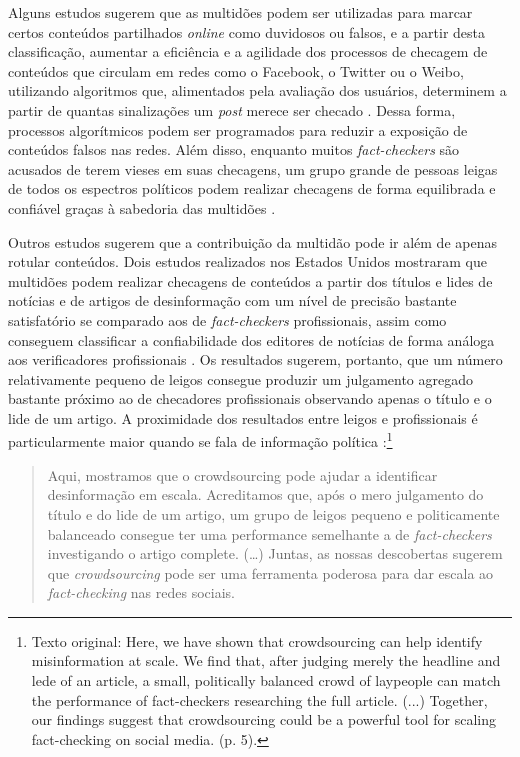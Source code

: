 \documentclass[portuguese]{textolivre}
\begin{document}
Alguns estudos sugerem que as multidões podem ser utilizadas para marcar certos conteúdos partilhados \emph{online} como duvidosos ou falsos, e a partir desta classificação, aumentar a eficiência e a agilidade dos processos de checagem de conteúdos que circulam em redes como o Facebook, o Twitter ou o Weibo, utilizando algoritmos que, alimentados pela avaliação dos usuários, determinem a partir de quantas sinalizações um \emph{post} merece ser checado \cite{kim_leveraging_2018}. Dessa forma, processos algorítmicos podem ser programados para reduzir a exposição de conteúdos falsos nas redes. Além disso, enquanto muitos \emph{fact-checkers} são acusados de terem vieses em suas checagens, um grupo grande de pessoas leigas de todos os espectros políticos podem realizar checagens de forma equilibrada e confiável graças à sabedoria das multidões \cite{allen_scaling_2021}.

Outros estudos sugerem que a contribuição da multidão pode ir além de apenas rotular conteúdos. Dois estudos realizados nos Estados Unidos mostraram que multidões podem realizar checagens de conteúdos a partir dos títulos e lides de notícias e de artigos de desinformação com um nível de precisão bastante satisfatório se comparado aos de \emph{fact-checkers} profissionais, assim como conseguem classificar a confiabilidade dos editores de notícias de forma análoga aos verificadores profissionais \cite{allen_scaling_2021, pennycook_fighting_2019}. Os resultados sugerem, portanto, que um número relativamente pequeno de leigos consegue produzir um julgamento agregado bastante próximo ao de checadores profissionais observando apenas o título e o lide de um artigo. A proximidade dos resultados entre leigos e profissionais é particularmente maior quando se fala de informação política \cite[p. 5, tradução nossa]{allen_scaling_2021}:\footnote{Texto original: Here, we have shown that crowdsourcing can help identify misinformation at scale. We find that, after judging merely the headline and lede of an article, a small, politically balanced crowd of laypeople can match the performance of fact-checkers researching the full article. (...) Together, our findings suggest that crowdsourcing could be a powerful tool for scaling fact-checking on social media. (p. 5).}

\begin{quote}
    Aqui, mostramos que o crowdsourcing pode ajudar a identificar desinformação em escala. Acreditamos que, após o mero julgamento do título e do lide de um artigo, um grupo de leigos pequeno e politicamente balanceado consegue ter uma performance semelhante a de \emph{fact-checkers} investigando o artigo complete. (…) Juntas, as nossas descobertas sugerem que \emph{crowdsourcing} pode ser uma ferramenta poderosa para dar escala ao \emph{fact-checking} nas redes sociais.
\end{quote}
\end{document}
